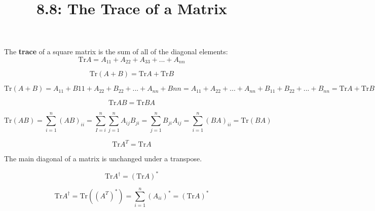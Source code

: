 \documentclass{article}
\title{8.8: The Trace of a Matrix}
\begin{document}
\maketitle
\begin{definition}[Trace]
The \textbf{trace} of a square matrix is the sum of all of the diagonal elements:$$\text{Tr} A = A_{11} + A_{22} + A_{33} + ... + A_{nn}$$ 
\end{definition}

\begin{proposition}
$$\text{Tr} (A+B) = \text{Tr}A + \text{Tr}B$$
\end{proposition}

\begin{customproof}
$$\text{Tr} (A+B) = A_{11} + B{11} + A_{22} + B_{22} + ... + A_{nn} + B{nn} = A_{11} + A_{22} + ... + A_{nn} + B_{11} + B_{22} + ... + B_{nn} = \text{Tr} A + \text{Tr} B$$
\end{customproof}

\begin{proposition}
$$\text{Tr} AB = \text{Tr} BA$$
\end{proposition}

\begin{customproof}
$$\text{Tr} (AB) = \sum_{i=1}^{n} (AB)_{ii} = \sum_{I=i}^{n} \sum_{j=1}^{n}A_{ij}B_{ji} = \sum_{j=1}^{n}B_{ji}A_{ij} = \sum_{i=1}^{n}(BA)_{ii} = \text{Tr} (BA)$$
\end{customproof}

\begin{proposition}
$$\text{Tr} A^T = \text{Tr} A$$
\end{proposition}

\begin{customproof}
The main diagonal of a matrix is unchanged under a transpose.
\end{customproof}

\begin{proposition}
$$\text{Tr} A^\dagger = (\text{Tr} A)^*$$
\end{proposition}

\begin{customproof}
$$\text{Tr} A^\dagger = \text{Tr}((A^T)^*) =\sum_{i=1}^{n}(A_{ii})^* = (\text{Tr}A)^*$$
\end{customproof}
\end{document}
